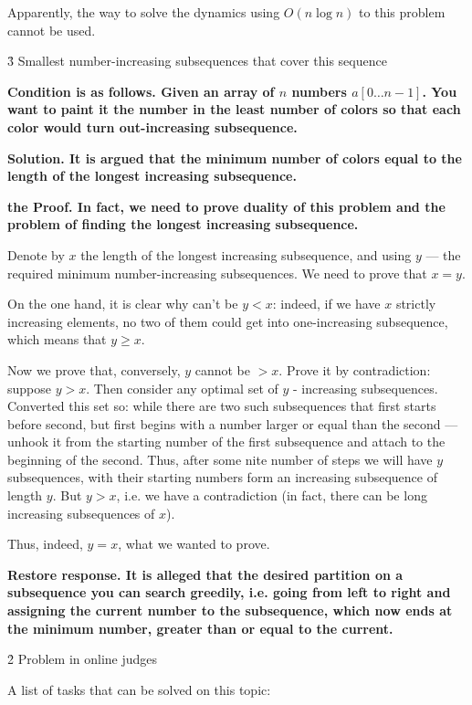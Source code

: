 Apparently, the way to solve the dynamics using $O (n \log n)$ to this problem cannot be used.


\h3{ Smallest number-increasing subsequences that cover this sequence }

\bf{Condition} is as follows. Given an array of $n$ numbers $a[0 \ldots n-1]$. You want to paint it the number in the least number of colors so that each color would turn out-increasing subsequence.

\bf{Solution}. It is argued that the minimum number of colors equal to the length of the longest increasing subsequence.

\bf{the Proof}. In fact, we need to prove \bf{duality} of this problem and the problem of finding the longest increasing subsequence.

Denote by $x$ the length of the longest increasing subsequence, and using $y$ --- the required minimum number-increasing subsequences. We need to prove that $x=y$.

On the one hand, it is clear why can't be $y<x$: indeed, if we have $x$ strictly increasing elements, no two of them could get into one-increasing subsequence, which means that $y \ge x$.

Now we prove that, conversely, $y$ cannot be $> x$. Prove it by contradiction: suppose $y > x$. Then consider any optimal set of $y$ - increasing subsequences. Converted this set so: while there are two such subsequences that first starts before second, but first begins with a number larger or equal than the second --- unhook it from the starting number of the first subsequence and attach to the beginning of the second. Thus, after some nite number of steps we will have $y$ subsequences, with their starting numbers form an increasing subsequence of length $y$. But $y > x$, i.e. we have a contradiction (in fact, there can be long increasing subsequences of $x$).

Thus, indeed, $y = x$, what we wanted to prove.

\bf{Restore response}. It is alleged that the desired partition on a subsequence you can search greedily, i.e. going from left to right and assigning the current number to the subsequence, which now ends at the minimum number, greater than or equal to the current.



\h2{ Problem in online judges }

A list of tasks that can be solved on this topic:

